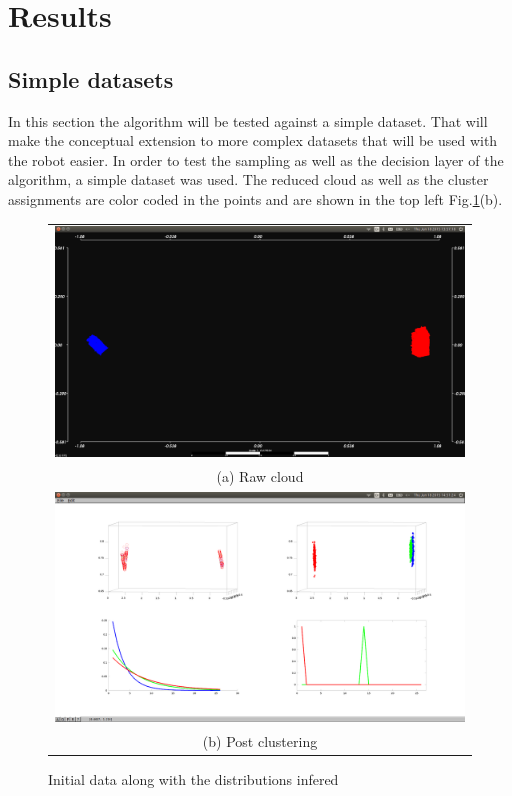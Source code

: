 \documentclass[twoside,hidelinks]{article}
\begin{document}
\section{Results}
\label{sec:results}

\subsection{Simple datasets}

In this section the algorithm will be tested against a simple dataset. That will make the conceptual extension to more complex datasets that will be used with the robot easier. In order to test the sampling as well as the decision layer of the algorithm, a simple dataset was used. The reduced cloud as well as the cluster assignments are color coded in the points and are shown in the top left Fig.\ref{pcl:clust}(b).

\begin{figure}
\begin{tabular}{c}
  \includegraphics[width=1\textwidth]{clusterings/initialData} \\
  (a) Raw cloud  \\
   \includegraphics[width=1\textwidth]{clusterings/colorcodedDistributions} \\
 (b) Post clustering \\[6pt]
\end{tabular}
\caption{Initial data along with the distributions infered}
  \label{pcl:clust}
\end{figure}
\end{document}
